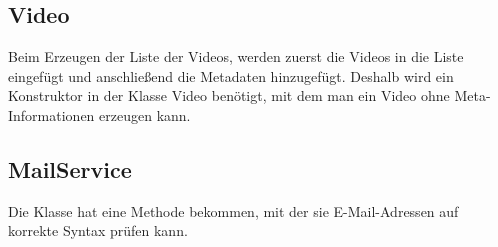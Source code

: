\subsection{Video}
Beim Erzeugen der Liste der Videos, werden zuerst die Videos in die Liste eingefügt und anschließend die Metadaten hinzugefügt. Deshalb wird ein Konstruktor in der Klasse Video benötigt, mit dem man ein Video ohne Meta-Informationen erzeugen kann.

\subsection{MailService}
Die Klasse hat eine Methode bekommen, mit der sie E-Mail-Adressen auf korrekte Syntax prüfen kann.